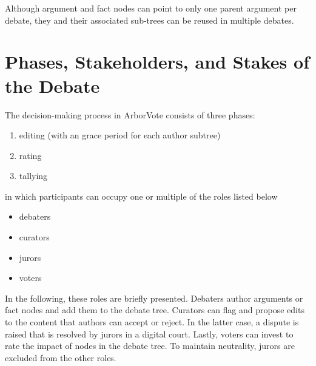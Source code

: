 \documentclass[%
aip,
amsmath,amssymb,
reprint,%
unsortedaddress,
nofootinbib
]{revtex4-2}
\begin{document}


%
%

Although argument and fact nodes can point to only one parent argument per debate,
they and their associated sub-trees can be reused in multiple debates.




\section{Phases, Stakeholders, and Stakes of the Debate}\label{sec:DebatingProcess}


The decision-making process in ArborVote consists of three phases:
\begin{enumerate}[noitemsep]
	\item editing (with an grace period for each author subtree)
	\item rating
	\item tallying
\end{enumerate}
in which participants can occupy one or multiple of the roles listed below
\begin{itemize}[noitemsep]
	\item debaters
	\item curators
	\item jurors
	\item voters
\end{itemize}
In the following, these roles are briefly presented.
Debaters author arguments or fact nodes and add them to the debate tree.
Curators can flag and propose edits to the content that authors can accept or reject.
In the latter case, a dispute is raised that is resolved by jurors in a digital court.
Lastly, voters can invest \debateTokens{} to rate the impact of nodes in the debate tree.
To maintain neutrality, jurors are excluded from the other roles.
\end{document}
